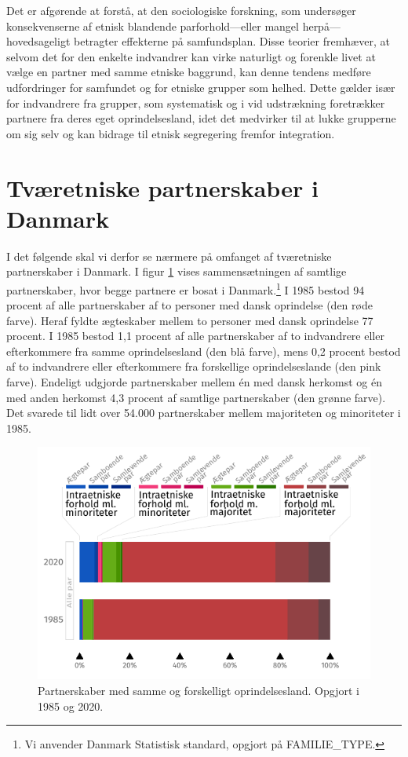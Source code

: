 \documentclass[
]{book}
\begin{document}
Det er afgørende at forstå, at den sociologiske forskning, som undersøger konsekvenserne af etnisk blandende parforhold---eller mangel herpå---hovedsageligt betragter effekterne på samfundsplan. Disse teorier fremhæver, at selvom det for den enkelte indvandrer kan virke naturligt og forenkle livet at vælge en partner med samme etniske baggrund, kan denne tendens medføre udfordringer for samfundet og for etniske grupper som helhed. Dette gælder især for indvandrere fra grupper, som systematisk og i vid udstrækning foretrækker partnere fra deres eget oprindelsesland, idet det medvirker til at lukke grupperne om sig selv og kan bidrage til etnisk segregering fremfor integration.

\section{Tværetniske partnerskaber i Danmark}\label{tvuxe6retniske-partnerskaber-i-danmark}

I det følgende skal vi derfor se nærmere på omfanget af tværetniske partnerskaber i Danmark. I figur \ref{fig:fig-2-1} vises sammensætningen af samtlige partnerskaber, hvor begge partnere er bosat i Danmark.\footnote{Vi anvender Danmark Statistisk standard, opgjort på FAMILIE\_TYPE.} I 1985 bestod 94 procent af alle partnerskaber af to personer med dansk oprindelse (den røde farve). Heraf fyldte ægteskaber mellem to personer med dansk oprindelse 77 procent. I 1985 bestod 1,1 procent af alle partnerskaber af to indvandrere eller efterkommere fra samme oprindelsesland (den blå farve), mens 0,2 procent bestod af to indvandrere eller efterkommere fra forskellige oprindelseslande (den pink farve). Endeligt udgjorde partnerskaber mellem én med dansk herkomst og én med anden herkomst 4,3 procent af samtlige partnerskaber (den grønne farve). Det svarede til lidt over 54.000 partnerskaber mellem majoriteten og minoriteter i 1985.

\begin{figure}

{\centering \includegraphics[width=0.75\linewidth]{images/figur_intergruppepartnerskaber_alle} 

}

\caption{ Partnerskaber med samme og forskelligt oprindelsesland. Opgjort i 1985 og 2020.}\label{fig:fig-2-1}
\end{figure}
\end{document}
